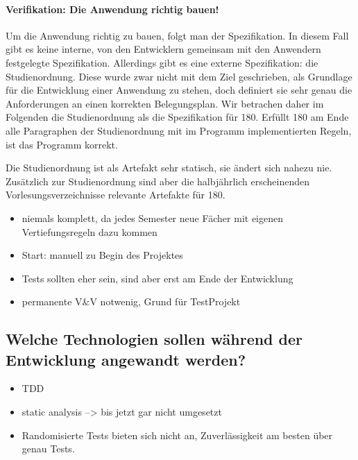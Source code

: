 \documentclass[ngerman]{article}
\begin{document}
\paragraph{Verifikation: Die Anwendung richtig bauen!}

Um die Anwendung richtig zu bauen, folgt man der Spezifikation.
In diesem Fall gibt es keine interne, von den Entwicklern gemeinsam mit den Anwendern festgelegte Spezifikation.
Allerdings gibt es eine externe Spezifikation: die Studienordnung.
Diese wurde zwar nicht mit dem Ziel geschrieben, als Grundlage für die Entwicklung einer Anwendung zu stehen, doch definiert sie sehr genau die Anforderungen an einen korrekten Belegungsplan.
Wir betrachen daher im Folgenden die Studienordnung als die Spezifikation für 180.
Erfüllt 180 am Ende alle Paragraphen der Studienordnung mit im Programm implementierten Regeln, ist das Programm korrekt.

Die Studienordnung ist als Artefakt sehr statisch, sie ändert sich nahezu nie.
Zusätzlich zur Studienordnung sind aber die halbjährlich erscheinenden Vorlesungsverzeichnisse relevante Artefakte für 180.

\begin{itemize}
    \item
        niemals komplett, da jedes Semester neue Fächer mit eigenen Vertiefungsregeln dazu kommen 
    \item
        Start: manuell zu Begin des Projektes
    \item
        Tests sollten eher sein, sind aber erst am Ende der Entwicklung
    \item
        permanente V\&V notwenig, Grund für TestProjekt
\end{itemize}

\subsection{Welche Technologien sollen während der Entwicklung angewandt werden?}

\begin{itemize}
    \item
        TDD
    \item
        static analysis --\textgreater{} bis jetzt gar nicht umgesetzt
    \item
        Randomisierte Tests bieten sich nicht an, Zuverlässigkeit am besten über genau Tests.
\end{itemize}
\end{document}
